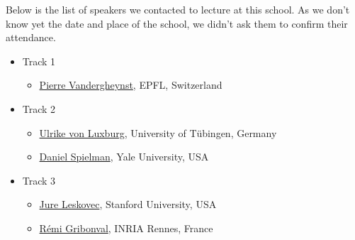 \documentclass[a4paper]{scrartcl}
\begin{document}
Below is the list of speakers we contacted to lecture at this school. As we
don't know yet the date and place of the school, we didn't ask them to confirm
their attendance.
\begin{itemize}
\setlength{\itemsep}{0pt} \setlength{\parskip}{0pt}
\item Track 1
	\begin{itemize}
	\setlength{\itemsep}{0pt} \setlength{\parskip}{0pt}
	\item \href{http://people.epfl.ch/pierre.vandergheynst}
		{Pierre Vandergheynst}, EPFL, Switzerland
	\end{itemize}
\item Track 2
	\begin{itemize}
	\setlength{\itemsep}{0pt} \setlength{\parskip}{0pt}
	\item \href{http://www.wsi.uni-tuebingen.de/lehrstuehle/theory-of-machine-learning/people/ulrike-von-luxburg.html}
		{Ulrike von Luxburg}, University of Tübingen, Germany
	\item \href{http://www.cs.yale.edu/homes/spielman/}
		{Daniel Spielman}, Yale University, USA
	\end{itemize}
\item Track 3
	\begin{itemize}
	\setlength{\itemsep}{0pt} \setlength{\parskip}{0pt}
	\item \href{http://cs.stanford.edu/people/jure/}
		{Jure Leskovec}, Stanford University, USA
	\item \href{http://people.irisa.fr/Remi.Gribonval/}
		{Rémi Gribonval}, INRIA Rennes, France
	\end{itemize}
\end{itemize}
\end{document}
